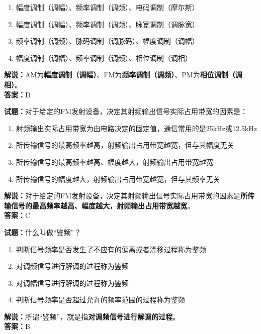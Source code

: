 \documentclass{ctexbook}
\begin{document}
\begin{enumerate}[leftmargin=3em]
	\item 幅度调制（调幅）、频率调制（调频）、电码调制（摩尔斯）
	\item 幅度调制（调幅）、频率调制（调频）、脉宽调制（调脉宽）
	\item 频率调制（调频）、脉码调制（调脉码）、幅度调制（调幅）
	\item 幅度调制（调幅）、频率调制（调频）、相位调制（调相）
\end{enumerate}

\noindent\textbf{解说：}AM为\textbf{幅度调制（调幅）}、FM为\textbf{频率调制（调频）}、PM为\textbf{相位调制（调相）}。\\\noindent\textbf{答案：}D%


\bigskip


\noindent\textbf{试题：}对于给定的FM发射设备，决定其射频输出信号实际占用带宽的因素是：

\begin{enumerate}[leftmargin=3em]
	\item 射频输出实际占用带宽为由电路决定的固定值，通信常用的是25\si{\kHz}或12.5\si{\kHz}
	\item 所传输信号的最高频率越高，射频输出占用带宽越宽，但与其幅度无关
	\item 所传输信号的最高频率越高、幅度越大，射频输出占用带宽越宽
	\item 所传输信号的幅度越大，射频输出占用带宽越宽，但与其频率无关
\end{enumerate}

\noindent\textbf{解说：}对于给定的FM发射设备，决定其射频输出信号实际占用带宽的因素是\textbf{所传输信号的最高频率越高、幅度越大，射频输出占用带宽越宽}。\\\noindent\textbf{答案：}C%


\bigskip


\noindent\textbf{试题：}什么叫做“鉴频”？

\begin{enumerate}[leftmargin=3em]
	\item 判断信号频率是否发生了不应有的偏离或者漂移过程称为鉴频
	\item 对调频信号进行解调的过程称为鉴频
	\item 对调幅信号进行解调的过程称为鉴频
	\item 判断信号频率是否超过允许的频率范围的过程称为鉴频
\end{enumerate}

\noindent\textbf{解说：}所谓“鉴频”，就是指\textbf{对调频信号进行解调的过程}。\\\noindent\textbf{答案：}B
\end{document}
